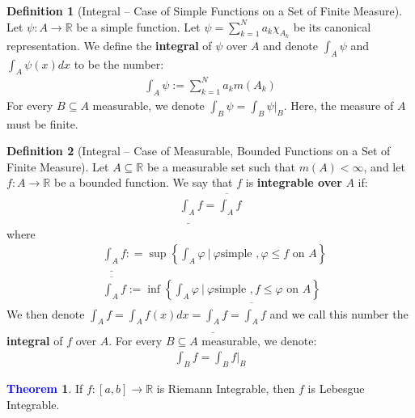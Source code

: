 \documentclass[11pt]{article}
\theoremstyle{definition}
\newcommand{\bb}[1]{\mathbb{#1}}
\newcommand{\sets}[2]{ \left\{ #1\ |\ #2 \right\}}
\newtheorem{theorem}{\textcolor{blue}{Theorem}}
\theoremstyle{definition}
\newtheorem{definition}{\textcolor{OliveGreen}{Definition}}
\theoremstyle{remark}
\newcommand{\upRiemannint}[2]{
  \overline{\int_{#1}^{#2}}
}
\newcommand{\loRiemannint}[2]{
  \underline{\int_{#1}^{#2}}
}
\begin{document}
\begin{definition}[Integral -- Case of Simple Functions on a Set of Finite Measure] Let $\psi: A \rightarrow \bb{R}$ be a simple function. Let $\psi = \sum_{k=1}^N a_k \chi_{A_k} $ be its canonical representation. We define the \textbf{integral} of $\psi$ over $A$ and denote $\int_A \psi$ and $\int_A \psi(x) dx$ to be the number: 
\begin{align}
	\int_A \psi := \sum_{k=1}^N a_k m(A_k) 
\end{align}
	For every $B \subseteq A$ measurable, we denote $\int_B \psi = \int_B \psi|_B$. Here, the measure of $A$ must be finite. 
\end{definition}
\begin{definition}[Integral -- Case of Measurable, Bounded Functions on a Set of Finite Measure] Let $A \subseteq \bb{R}$ be a measurable set such that $m(A) < \infty$, and let $f: A \rightarrow \bb{R}$ be a bounded function. We say that $f$ is \textbf{integrable over} $A$ if: 
	\begin{align}
		\loRiemannint{A}{} f = \upRiemannint{A}{} f
	\end{align}
	where 
	\begin{align*}
		& \loRiemannint{A}{} f : = \sup \sets{\int_A \varphi }{ \varphi \mbox{simple }, \varphi \leq f \mbox{ on } A } \\
		& \upRiemannint{A}{} f := \inf \sets{\int_A \varphi}{\varphi \mbox{simple }, f \leq \varphi \mbox{ on } A}
	\end{align*}
	We then denote $\int_A f = \int_A f(x) dx = \loRiemannint{A}{} f = \upRiemannint{A}{} f$ and we call this number the \textbf{integral} of $f$ over $A$. For every $B \subseteq A$ measurable, we denote: 
	\begin{align*}
		\int_B f = \int_B f|_B	
	\end{align*}
\end{definition}

\begin{theorem}
	If $f: [a,b] \rightarrow \bb{R}$ is Riemann Integrable, then $f$ is Lebesgue Integrable. 
\end{theorem}
\end{document}
